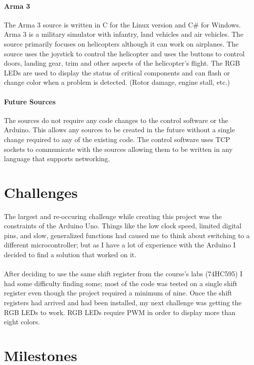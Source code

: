\documentclass[12pt,a4paper]{article}
\begin{document}
\paragraph{Arma 3}
The Arma 3 source is written in C for the Linux version and C\# for Windows. Arma 3 is a military simulator with infantry, land vehicles and air vehicles. The source primarily focuses on helicopters although it can work on airplanes. The source uses the joystick to control the helicopter and uses the buttons to control doors, landing gear, trim and other aspects of the helicopter's flight. The \gls{RGB} \glspl{LED} are used to display the status of critical components and can flash or change color when a problem is detected. (Rotor damage, engine stall, etc.)
\paragraph{Future Sources}
The sources do not require any code changes to the control software or the Arduino. This allows any sources to be created in the future without a single change required to any of the existing code. The control software uses \gls{TCP} sockets to communicate with the sources allowing them to be written in any language that supports networking.
\section{Challenges}
\paragraph{}
The largest and re-occuring challenge while creating this project was the constraints of the Arduino Uno. Things like the low clock speed, limited digital pins, and slow, generalized functions had caused me to think about switching to a different microcontroller; but as I have a lot of experience with the Arduino I decided to find a solution that worked on it.
\paragraph{}
After deciding to use the same shift register from the course's labs (74HC595) I had some difficulty finding some; most of the code was tested on a single shift register even though the project required a minimum of nine. Once the shift registers had arrived and had been installed, my next challenge was getting the \gls{RGB} \glspl{LED} to work. \gls{RGB} \glspl{LED} require \gls{PWM} in order to display more than eight colors.
\section{Milestones}
\end{document}
